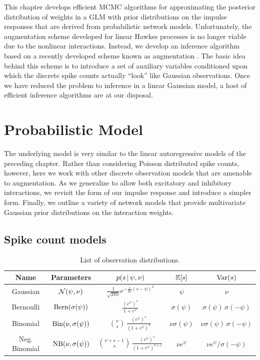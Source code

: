 This chapter develops efficient MCMC algorithms for approximating the
posterior distribution of weights in a GLM with prior distributions on
the impulse responses that are derived from probabilistic network
models.  Unfortunately, the augmentation scheme developed for linear
Hawkes processes is no longer viable due to the nonlinear
interactions. Instead, we develop an inference algorithm based on a
recently developed scheme known as \polyagamma augmentation
\citep{polson2013bayesian}. The basic idea behind this scheme is to
introduce a set of auxiliary variables conditioned upon which the
discrete spike counts actually ``look'' like Gaussian observations.
Once we have reduced the problem to inference in a linear Gaussian
model, a host of efficient inference algorithms are at our disposal.


\section{Probabilistic Model}
The underlying model is very similar to the linear autoregressive 
models of the preceding chapter. Rather than considering Poisson 
distributed spike counts, however, here we work with other discrete 
observation models that are amenable to \polyagamma augmentation. 
As we generalize to allow both excitatory and inhibitory interactions, 
we revisit the form of our impulse response and introduce a simpler
form. Finally, we outline a variety of network models that provide 
multivariate Gaussian prior distributions on the interaction weights.

\subsection{Spike count models}

\begin{table}
\begin{center}
\begin{tabular}{c|c|c|c|c}
  \textbf{Name} & Parameters & $p(s \,|\, \psi, \nu)$ & $\mathbb{E}[s]$ & $\mathrm{Var}(s)$ \\
  \hline
  Gaussian 
  & $\mathcal{N}(\psi, \nu)$ 
  & $\frac{1}{\sqrt{2 \pi \nu}} e^{ -\frac{1}{2 \nu} (s - \psi)^2}$
  & $\psi$ & $\nu$ \\
  Bernoulli 
  & $\mathrm{Bern}(\sigma(\psi))$ 
  & $\frac{(e^\psi)^s}{1+e^\psi}$
  & $\sigma(\psi)$ & $\sigma(\psi) \, \sigma(-\psi)$ \\
  Binomial 
  & $\mathrm{Bin}(\nu, \sigma(\psi))$ 
  & ${\nu \choose s} \,\frac{(e^\psi)^s}{(1+e^\psi)^\nu}$
  & $\nu \sigma(\psi)$ & $\nu \sigma(\psi) \, \sigma(-\psi)$ \\
  Neg. Binomial 
  & $\mathrm{NB}(\nu, \sigma(\psi))$
  & ${\nu +s - 1 \choose s} \,\frac{(e^\psi)^s}{(1+e^\psi)^{\nu+s}}$
  & $\nu e^\psi$ & $\nu e^\psi / \sigma(-\psi)$ \\
\end{tabular}
\end{center}
\caption{List of observation distributions.}
\label{tab:obs_models}
\end{table}

